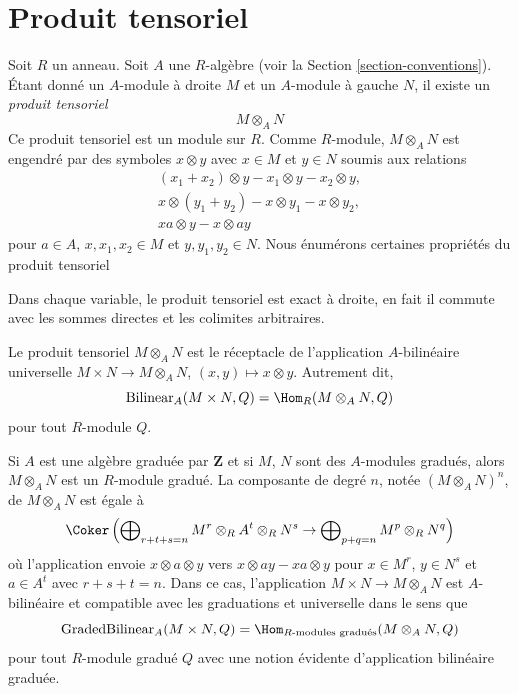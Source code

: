 \section{Produit tensoriel}
\label{section-tensor-product}

\noindent
Soit $R$ un anneau. Soit $A$ une $R$-algèbre (voir la Section
\ref{section-conventions}). Étant donné un $A$-module à droite $M$ et un
$A$-module à gauche $N$, il existe un {\it produit tensoriel}
$$
M \otimes_A N
$$
Ce produit tensoriel est un module sur $R$. Comme $R$-module, $M \otimes_A N$ est
engendré par des symboles $x \otimes y$ avec $x \in M$ et $y \in N$ soumis aux
relations
$$
\begin{matrix}
(x_1 + x_2) \otimes y - x_1 \otimes y - x_2 \otimes y, \\
x \otimes (y_1 + y_2) - x \otimes y_1 - x \otimes y_2, \\
xa \otimes y - x \otimes ay
\end{matrix}
$$
pour $a \in A$, $x, x_1, x_2 \in M$ et $y, y_1, y_2 \in N$. Nous énumérons
certaines propriétés du produit tensoriel

\medskip\noindent
Dans chaque variable, le produit tensoriel est exact à droite, en fait il commute
avec les sommes directes et les colimites arbitraires.

\medskip\noindent
Le produit tensoriel $M \otimes_A N$ est le réceptacle de l'application
$A$-bilinéaire universelle $M \times N \to M \otimes_A N$, $(x, y) \mapsto x
\otimes y$. Autrement dit,
$$
\text{Bilinear}_A(M \times N, Q) = \Hom_R(M \otimes_A N, Q)
$$
pour tout $R$-module $Q$.

\medskip\noindent
Si $A$ est une algèbre graduée par $\mathbf{Z}$ et si $M$, $N$ sont des $A$-modules
gradués, alors $M \otimes_A N$ est un $R$-module gradué. La composante de degré $n$,
notée $(M \otimes_A N)^n$, de $M \otimes_A N$ est égale à
$$
\Coker\left(
\bigoplus\nolimits_{r + t + s = n}
M^r \otimes_R A^t \otimes_R N^s \to
\bigoplus\nolimits_{p + q = n} M^p \otimes_R N^q
\right)
$$
où l'application envoie $x \otimes a \otimes y$ vers $x \otimes ay - xa \otimes y$
pour $x \in M^r$, $y \in N^s$ et $a \in A^t$ avec $r + s + t = n$. Dans ce cas,
l'application $M \times N \to M \otimes_A N$ est $A$-bilinéaire et compatible avec
les graduations et universelle dans le sens que
$$
\text{GradedBilinear}_A(M \times N, Q) =
\Hom_{\text{}R\text{-modules gradués}}(M \otimes_A N, Q)
$$
pour tout $R$-module gradué $Q$ avec une notion évidente d'application bilinéaire
graduée.

